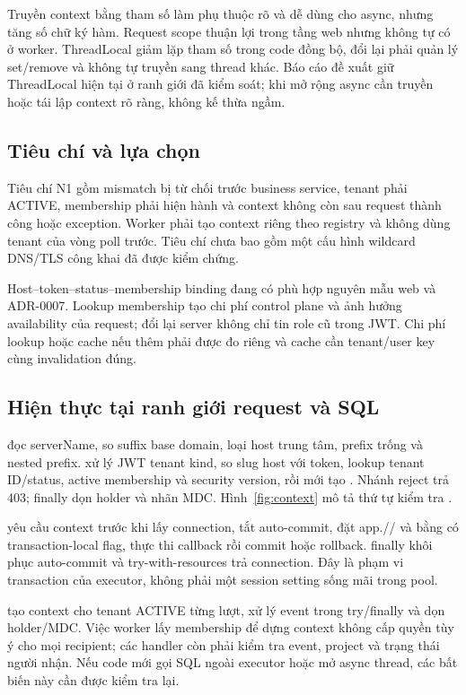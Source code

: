 Truyền context bằng tham số làm phụ thuộc rõ và dễ dùng cho async, nhưng tăng số chữ ký hàm. Request scope thuận lợi trong tầng web nhưng không tự có ở worker. ThreadLocal giảm lặp tham số trong code đồng bộ, đổi lại phải quản lý set\slash remove và không tự truyền sang thread khác. Báo cáo đề xuất giữ ThreadLocal hiện tại ở ranh giới đã kiểm soát; khi mở rộng async cần truyền hoặc tái lập context rõ ràng, không kế thừa ngầm.

\subsection{Tiêu chí và lựa chọn}
Tiêu chí N1 gồm mismatch bị từ chối trước business service, tenant phải ACTIVE, membership phải hiện hành và context không còn sau request thành công hoặc exception. Worker phải tạo context riêng theo registry và không dùng tenant của vòng poll trước. Tiêu chí chưa bao gồm một cấu hình wildcard DNS\slash TLS công khai đã được kiểm chứng.

Host--token--status--membership binding đang có phù hợp nguyên mẫu web và ADR-0007. Lookup membership tạo chi phí control plane và ảnh hưởng availability của request; đổi lại server không chỉ tin role cũ trong JWT. Chi phí lookup hoặc cache nếu thêm phải được đo riêng và cache cần tenant\slash user key cùng invalidation đúng.

\subsection{Hiện thực tại ranh giới request và SQL}
 đọc serverName, so suffix base domain, loại host trung tâm, prefix trống và nested prefix.  xử lý JWT tenant kind, so slug host với token, lookup tenant ID\slash status, active membership và security version, rồi mới tạo . Nhánh reject trả 403; finally dọn holder và nhãn MDC. Hình~\ref{fig:context} mô tả thứ tự kiểm tra .


 yêu cầu context trước khi lấy connection, tắt auto-commit, đặt app.\slash {}\slash {} và  bằng  có transaction-local flag, thực thi callback rồi commit hoặc rollback. finally khôi phục auto-commit và try-with-resources trả connection. Đây là phạm vi transaction của executor, không phải một session setting sống mãi trong pool.

 tạo context cho tenant ACTIVE từng lượt, xử lý event trong try\slash finally và dọn holder\slash MDC. Việc worker lấy membership để dựng context không cấp quyền tùy ý cho mọi recipient; các handler còn phải kiểm tra event, project và trạng thái người nhận. Nếu code mới gọi SQL ngoài executor hoặc mở async thread, các bất biến này cần được kiểm tra lại.

